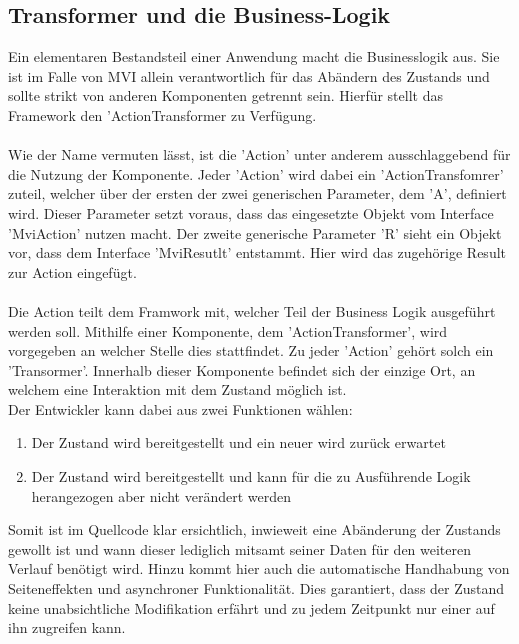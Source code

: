 \subsection{Transformer und die Business-Logik}
Ein elementaren Bestandsteil einer Anwendung macht die Businesslogik aus. Sie ist im Falle von MVI allein verantwortlich für das Abändern des Zustands und sollte strikt von anderen Komponenten getrennt sein.
Hierfür stellt das Framework den 'ActionTransformer zu Verfügung.
\\\\
Wie der Name vermuten lässt, ist die 'Action' unter anderem ausschlaggebend für die Nutzung der Komponente. Jeder 'Action' wird dabei ein 'ActionTransfomrer' zuteil, welcher über der ersten der zwei generischen Parameter, dem 'A', definiert wird. Dieser Parameter setzt voraus, dass das eingesetzte Objekt vom Interface 'MviAction' nutzen macht. Der zweite generische Parameter 'R' sieht ein Objekt vor, dass dem Interface 'MviResutlt' entstammt. Hier wird das zugehörige Result zur Action eingefügt. 
\\\\
Die Action teilt dem Framwork mit, welcher Teil der Business Logik ausgeführt werden soll. Mithilfe einer Komponente, dem 'ActionTransformer', wird vorgegeben an welcher Stelle dies stattfindet. Zu jeder 'Action' gehört solch ein 'Transormer'. Innerhalb dieser Komponente befindet sich der einzige Ort, an welchem eine Interaktion mit dem Zustand möglich ist.
\\
Der Entwickler kann dabei aus zwei Funktionen wählen:
\begin{enumerate}
	\item Der Zustand wird bereitgestellt und ein neuer wird zurück erwartet
	\item Der Zustand wird bereitgestellt und kann für die zu Ausführende Logik herangezogen aber nicht verändert werden 
\end{enumerate}
\bigskip
Somit ist im Quellcode klar ersichtlich, inwieweit eine Abänderung der Zustands gewollt ist und wann dieser lediglich mitsamt seiner Daten für den weiteren Verlauf benötigt wird. Hinzu kommt hier auch die automatische Handhabung von Seiteneffekten und asynchroner Funktionalität. Dies garantiert, dass der Zustand keine unabsichtliche Modifikation erfährt und zu jedem Zeitpunkt nur einer auf ihn zugreifen kann.

